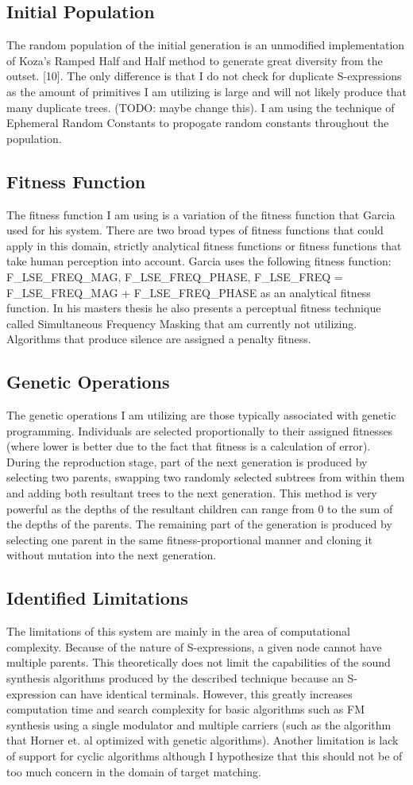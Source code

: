 \documentclass[12pt]{article}
\begin{document}
\subsection{Initial Population}
The random population of the initial generation is an unmodified implementation of Koza's Ramped Half and Half method to generate great diversity from the outset. [10]. The only difference is that I do not check for duplicate S-expressions as the amount of primitives I am utilizing is large and will not likely produce that many duplicate trees. (TODO: maybe change this). I am using the technique of Ephemeral Random Constants to propogate random constants throughout the population.
\subsection{Fitness Function}
The fitness function I am using is a variation of the fitness function that Garcia used for his system. There are two broad types of fitness functions that could apply in this domain, strictly analytical fitness functions or fitness functions that take human perception into account. Garcia uses the following fitness function: F_LSE_FREQ_MAG, F_LSE_FREQ_PHASE, F_LSE_FREQ = F_LSE_FREQ_MAG + F_LSE_FREQ_PHASE as an analytical fitness function. In his masters thesis he also presents a perceptual fitness technique called Simultaneous Frequency Masking that am currently not utilizing. Algorithms that produce silence are assigned a penalty fitness.
\subsection{Genetic Operations}
The genetic operations I am utilizing are those typically associated with genetic programming. Individuals are selected proportionally to their assigned fitnesses (where lower is better due to the fact that fitness is a calculation of error). During the reproduction stage, part of the next generation is produced by selecting two parents, swapping two randomly selected subtrees from within them and adding both resultant trees to the next generation. This method is very powerful as the depths of the resultant children can range from 0 to the sum of the depths of the parents. The remaining part of the generation is produced by selecting one parent in the same fitness-proportional manner and cloning it without mutation into the next generation.
\subsection{Identified Limitations}
The limitations of this system are mainly in the area of computational complexity. Because of the nature of S-expressions, a given node cannot have multiple parents. This theoretically does not limit the capabilities of the sound synthesis algorithms produced by the described technique because an S-expression can have identical terminals. However, this greatly increases computation time and search complexity for basic algorithms such as FM synthesis using a single modulator and multiple carriers (such as the algorithm that Horner et. al optimized with genetic algorithms). Another limitation is lack of support for cyclic algorithms although I hypothesize that this should not be of too much concern in the domain of target matching.
\end{document}
